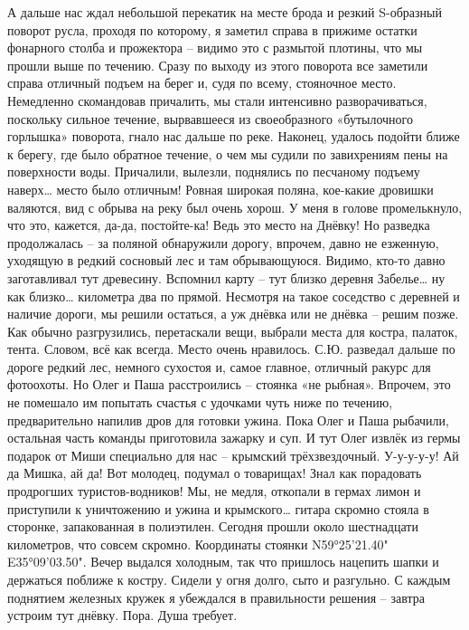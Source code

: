 А дальше нас ждал небольшой перекатик на месте брода и резкий S-образный поворот русла, проходя по которому, я заметил справа в прижиме остатки фонарного столба и прожектора – видимо это с размытой плотины, что мы прошли выше по течению. Сразу по выходу из этого поворота все заметили справа отличный подъем на берег и, судя по всему, стояночное место. Немедленно скомандовав причалить, мы стали интенсивно разворачиваться, поскольку сильное течение, вырвавшееся из своеобразного «бутылочного горлышка» поворота, гнало нас дальше по реке. Наконец, удалось подойти ближе к берегу, где было обратное течение, о чем мы судили по завихрениям пены на поверхности воды. Причалили, вылезли, поднялись по песчаному подъему наверх… место было отличным! Ровная широкая поляна, кое-какие дровишки валяются, вид с обрыва на реку был очень хорош. У меня в голове промелькнуло, что это, кажется, да-да, постойте-ка! Ведь это место на Днёвку! 
Но разведка продолжалась – за поляной обнаружили дорогу, впрочем, давно не езженную, уходящую в редкий сосновый лес и там обрывающуюся. Видимо, кто-то давно заготавливал тут древесину. Вспомнил карту – тут близко деревня Забелье… ну как близко… километра два по прямой. Несмотря на такое соседство с деревней и наличие дороги, мы решили остаться, а уж днёвка или не днёвка – решим позже.
Как обычно разгрузились, перетаскали вещи, выбрали места для костра, палаток, тента. Словом, всё как всегда. Место очень нравилось. С.Ю. разведал дальше по дороге редкий лес, немного сухостоя и, самое главное, отличный ракурс для фотоохоты. Но Олег и Паша расстроились – стоянка «не рыбная». Впрочем, это не помешало им попытать счастья с удочками чуть ниже по течению, предварительно напилив дров для готовки ужина. Пока Олег и Паша рыбачили, остальная часть команды приготовила зажарку и суп.
И тут Олег извлёк из гермы подарок от Миши специально для нас – крымский трёхзвездочный. У-у-у-у-у! Ай да Мишка, ай да! Вот молодец, подумал о товарищах! Знал как порадовать продрогших туристов-водников! Мы, не медля, откопали в гермах лимон и приступили к уничтожению и ужина и крымского… гитара скромно стояла в сторонке, запакованная в полиэтилен. 
Сегодня прошли около шестнадцати километров, что совсем скромно. Координаты стоянки N59°25'21.40" E35°09'03.50". Вечер выдался холодным, так что пришлось нацепить шапки и держаться поближе к костру. Сидели у огня долго, сыто и разгульно. С каждым поднятием железных кружек я убеждался в правильности решения – завтра устроим тут днёвку. Пора. Душа требует. 

\begin{center}
\end{center}

